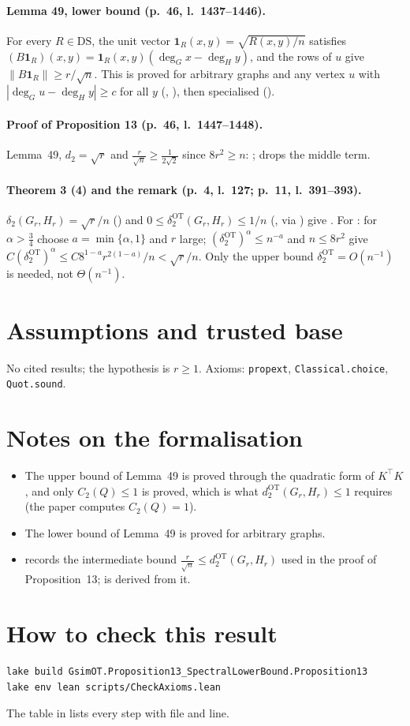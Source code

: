 \paragraph{Lemma 49, lower bound (p.~46, l.~1437--1446).} For every $R\in\mathrm{DS}$, the unit vector
$\mathbf 1_R(x,y)=\sqrt{R(x,y)/n}$ satisfies $(B\mathbf 1_R)(x,y)=\mathbf 1_R(x,y)(\deg_G x-\deg_H y)$, and the rows
of $u$ give $\|B\mathbf 1_R\|\ge r/\sqrt n$. This is proved for arbitrary graphs and any vertex $u$ with
$|\deg_G u-\deg_H y|\ge c$ for all $y$ (, ), then specialised
().

\paragraph{Proof of Proposition 13 (p.~46, l.~1447--1448).} Lemma~49, $d_2=\sqrt r$ and $\frac r{\sqrt n}\ge
\frac1{2\sqrt2}$ since $8r^2\ge n$: ;  drops the middle term.

\paragraph{Theorem 3 (4) and the remark (p.~4, l.~127; p.~11, l.~391--393).} $\delta_2(G_r,H_r)=\sqrt r/n$
() and $0\le\delta^{\mathrm{OT}}_2(G_r,H_r)\le1/n$ (, via
) give . For : for $\alpha>\frac34$ choose
$a=\min\{\alpha,1\}$ and $r$ large; $(\delta^{\mathrm{OT}}_2)^\alpha\le n^{-a}$ and $n\le8r^2$ give
$C(\delta^{\mathrm{OT}}_2)^\alpha\le C8^{1-a}r^{2(1-a)}/n<\sqrt r/n$. Only the upper bound
$\delta^{\mathrm{OT}}_2=O(n^{-1})$ is needed, not $\Theta(n^{-1})$.

\section{Assumptions and trusted base}
No cited results; the hypothesis is $r\ge1$. Axioms: \texttt{propext}, \texttt{Classical.choice},
\texttt{Quot.sound}.

\section{Notes on the formalisation}
\begin{itemize}
\item The upper bound of Lemma~49 is proved through the quadratic form of $K^\top K$, and only $C_2(Q)\le1$ is
  proved, which is what $d^{\mathrm{OT}}_2(G_r,H_r)\le1$ requires (the paper computes $C_2(Q)=1$).
\item The lower bound of Lemma~49 is proved for arbitrary graphs.
\item {} records the intermediate bound $\frac r{\sqrt n}\le d^{\mathrm{OT}}_2(G_r,H_r)$ used in the
  proof of Proposition~13;  is derived from it.
\end{itemize}

\section{How to check this result}
\begin{verbatim}
lake build GsimOT.Proposition13_SpectralLowerBound.Proposition13
lake env lean scripts/CheckAxioms.lean
\end{verbatim}
The table in  lists every step with file and line.


